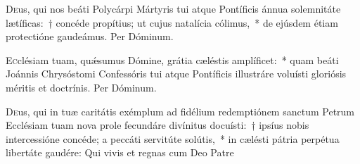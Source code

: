 \documentclass[vesperale_romanum.tex]{subfiles}
\begin{document}
\oratio

 \lettrine{D}{e}us, qui nos beáti Polycárpi Mártyris tui atque Pontíficis ánnua solemnitáte lætíficas:~† concéde propítius; ut cujus natalícia cólimus,~* de ejúsdem étiam prote\-ctióne gaudeámus. Per Dóminum.
 
 \capitdeseq

\myrule


\duplexmtv


\oratio

\lettrine{E}{c}clésiam tuam, quǽsumus Dómine, grátia cæléstis amplíficet:~* quam beáti Joánnis Chrysóstomi Confessóris tui atque Pontíficis illustráre voluísti gloriósis méritis et do\-ctrínis. Per Dóminum.



\myrule


\duplexmtv


\oratio

 \lettrine{D}{e}us, qui in tuæ caritátis exémplum ad fidélium red\-em\-ptiónem sanctum Petrum Ecclésiam tuam nova prole fecundáre divínitus docuísti:~† i\-psíus nobis intercessióne concéde; a peccáti servitúte solútis,~* in cælésti pátria perpétua libertáte gaudére:
Qui vivis et regnas cum Deo Patre






\end{document}
